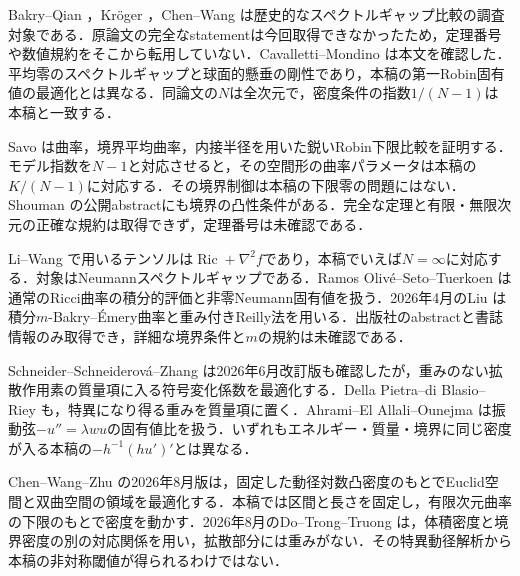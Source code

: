 \documentclass[12pt]{amsart}
\theoremstyle{definition}
\theoremstyle{remark}
\numberwithin{equation}{section}
\DeclareMathOperator{\Ric}{Ric}
\begin{document}
\begin{description}[style=nextline,leftmargin=0pt,labelwidth=0pt,labelsep=0pt]
\item[スペクトルギャップと局所化.]
Bakry--Qian \cite{BQ}，Kr\"oger \cite{Kroeger}，Chen--Wang \cite{CW}は歴史的なスペクトルギャップ比較の調査対象である．原論文の完全なstatementは今回取得できなかったため，定理番号や数値規約をそこから転用していない．Cavalletti--Mondino \cite[Theorem 4.4, Corollary 4.7]{CM}は本文を確認した．平均零のスペクトルギャップと球面的懸垂の剛性であり，本稿の第一Robin固有値の最適化とは異なる．同論文の$N$は全次元で，密度条件の指数$1/(N-1)$は本稿と一致する．
\item[Robin固有値の幾何学的比較.]
Savo \cite[Theorem 1, \S4.1]{Savo}は曲率，境界平均曲率，内接半径を用いた鋭いRobin下限比較を証明する．モデル指数を$N-1$と対応させると，その空間形の曲率パラメータは本稿の$K/(N-1)$に対応する．その境界制御は本稿の下限零の問題にはない．Shouman \cite{Shouman}の公開abstractにも境界の凸性条件がある．完全な定理と有限・無限次元の正確な規約は取得できず，定理番号は未確認である．
\item[重み付き非線形スペクトルと積分曲率.]
Li--Wang \cite[Theorem 1.1]{LW}で用いるテンソルは$\Ric+\nabla^2f$であり，本稿でいえば$N=\infty$に対応する．対象はNeumannスペクトルギャップである．Ramos Oliv\'e--Seto--Tuerkoen \cite[Theorem 1.3]{RST}は通常のRicci曲率の積分的評価と非零Neumann固有値を扱う．2026年4月のLiu \cite{Liu}は積分$m$-Bakry--\'Emery曲率と重み付きReilly法を用いる．出版社のabstractと書誌情報のみ取得でき，詳細な境界条件と$m$の規約は未確認である．
\item[2025--2026年の非対称・重み付きRobin最適化.]
Schneider--Schneiderov\'a--Zhang \cite[\S1, Theorem 3]{SSZ}は2026年6月改訂版も確認したが，重みのない拡散作用素の質量項に入る符号変化係数を最適化する．Della Pietra--di Blasio--Riey \cite[\S1, \S3]{DPR}も，特異になり得る重みを質量項に置く．Ahrami--El Allali--Ounejma \cite[\S1]{AEO}は振動弦$-u''=\lambda w u$の固有値比を扱う．いずれもエネルギー・質量・境界に同じ密度が入る本稿の$-h^{-1}(hu')'$とは異なる．
\item[同じ密度を用いる最近接の結果.]
Chen--Wang--Zhu \cite[Theorems 1.3, 1.5]{CWZ}の2026年8月版は，固定した動径対数凸密度のもとでEuclid空間と双曲空間の領域を最適化する．本稿では区間と長さを固定し，有限次元曲率の下限のもとで密度を動かす．2026年8月のDo--Trong--Truong \cite[\S1.1--1.2]{DTT}は，体積密度と境界密度の別の対応関係を用い，拡散部分には重みがない．その特異動径解析から本稿の非対称閾値が得られるわけではない．
\end{description}
\end{document}
